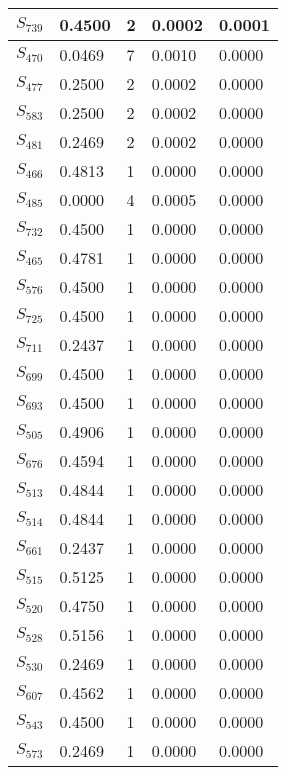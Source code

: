 \begin{xltabular}{\textwidth}{|X|X|X|X|X|}
 $S_{739}$ & 0.4500 & 2 & 0.0002 & 0.0001 \\ \hline
 $S_{470}$ & 0.0469 & 7 & 0.0010 & 0.0000 \\ \hline
 $S_{477}$ & 0.2500 & 2 & 0.0002 & 0.0000 \\ \hline
 $S_{583}$ & 0.2500 & 2 & 0.0002 & 0.0000 \\ \hline
 $S_{481}$ & 0.2469 & 2 & 0.0002 & 0.0000 \\ \hline
 $S_{466}$ & 0.4813 & 1 & 0.0000 & 0.0000 \\ \hline
 $S_{485}$ & 0.0000 & 4 & 0.0005 & 0.0000 \\ \hline
 $S_{732}$ & 0.4500 & 1 & 0.0000 & 0.0000 \\ \hline
 $S_{465}$ & 0.4781 & 1 & 0.0000 & 0.0000 \\ \hline
 $S_{576}$ & 0.4500 & 1 & 0.0000 & 0.0000 \\ \hline
 $S_{725}$ & 0.4500 & 1 & 0.0000 & 0.0000 \\ \hline
 $S_{711}$ & 0.2437 & 1 & 0.0000 & 0.0000 \\ \hline
 $S_{699}$ & 0.4500 & 1 & 0.0000 & 0.0000 \\ \hline
 $S_{693}$ & 0.4500 & 1 & 0.0000 & 0.0000 \\ \hline
 $S_{505}$ & 0.4906 & 1 & 0.0000 & 0.0000 \\ \hline
 $S_{676}$ & 0.4594 & 1 & 0.0000 & 0.0000 \\ \hline
 $S_{513}$ & 0.4844 & 1 & 0.0000 & 0.0000 \\ \hline
 $S_{514}$ & 0.4844 & 1 & 0.0000 & 0.0000 \\ \hline
 $S_{661}$ & 0.2437 & 1 & 0.0000 & 0.0000 \\ \hline
 $S_{515}$ & 0.5125 & 1 & 0.0000 & 0.0000 \\ \hline
 $S_{520}$ & 0.4750 & 1 & 0.0000 & 0.0000 \\ \hline
 $S_{528}$ & 0.5156 & 1 & 0.0000 & 0.0000 \\ \hline
 $S_{530}$ & 0.2469 & 1 & 0.0000 & 0.0000 \\ \hline
 $S_{607}$ & 0.4562 & 1 & 0.0000 & 0.0000 \\ \hline
 $S_{543}$ & 0.4500 & 1 & 0.0000 & 0.0000 \\ \hline
 $S_{573}$ & 0.2469 & 1 & 0.0000 & 0.0000 \\ \hline
    \end{xltabular}
    